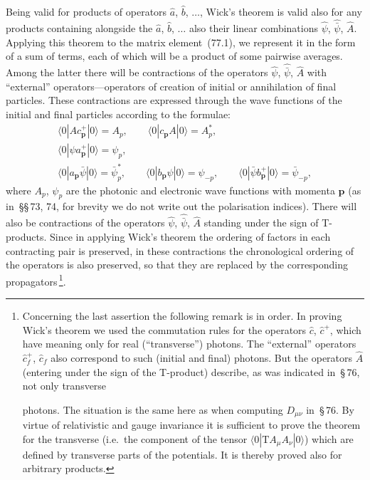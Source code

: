 Being valid for products of operators $\hat{a}$, $\hat{b}$, $\ldots$, Wick's theorem is valid also for any products containing alongside the $\hat{a}$, $\hat{b}$, $\ldots$ also their linear combinations $\hat{\psi}$, $\hat{\bar{\psi}}$, $\hat{A}$. Applying this theorem to the matrix element~(77.1), we represent it in the form of a sum of terms, each of which will be a product of some pairwise averages. Among the latter there will be contractions of the operators $\hat{\psi}$, $\hat{\bar{\psi}}$, $\hat{A}$ with ``external'' operators---operators of creation of initial or annihilation of final particles. These contractions are expressed through the wave functions of the initial and final particles according to the formulae:
\begin{equation}
\begin{gathered}
\langle 0|Ac_\mathbf{p}^+|0\rangle = A_p,\qquad \langle 0|c_\mathbf{p} A|0\rangle = A_p^*,\\[3pt]
\langle 0|\psi a_\mathbf{p}^+|0\rangle = \psi_p,\\[3pt]
\langle 0|a_\mathbf{p}\bar{\psi}|0\rangle = \bar{\psi}_p^*,\qquad \langle 0|b_\mathbf{p}\psi|0\rangle = \psi_{-p},\qquad \langle 0|\bar{\psi}b_\mathbf{p}^+|0\rangle = \bar{\psi}_{-p},
\end{gathered}
\tag{77.3}
\end{equation}
where $A_p$, $\psi_p$ are the photonic and electronic wave functions with momenta $\mathbf{p}$ (as in~\S\S\,73, 74, for brevity we do not write out the polarisation indices). There will also be contractions of the operators $\hat{\psi}$, $\hat{\bar{\psi}}$, $\hat{A}$ standing under the sign of T-products. Since in applying Wick's theorem the ordering of factors in each contracting pair is preserved, in these contractions the chronological ordering of the operators is also preserved, so that they are replaced by the corresponding propagators\,\footnote{Concerning the last assertion the following remark is in order. In proving Wick's theorem we used the commutation rules for the operators $\hat{c}$, $\hat{c}^+$, which have meaning only for real (``transverse'') photons. The ``external'' operators $\hat{c}_f^+$, $\hat{c}_f$ also correspond to such (initial and final) photons. But the operators $\hat{A}$ (entering under the sign of the T-product) describe, as was indicated in~\S\,76, not only transverse

photons. The situation is the same here as when computing $D_{\mu\nu}$ in~\S\,76. By virtue of relativistic and gauge invariance it is sufficient to prove the theorem for the transverse (i.e.\ the component of the tensor $\langle 0|\mathrm{T}A_\mu A_\nu|0\rangle$) which are defined by transverse parts of the potentials. It is thereby proved also for arbitrary products.}.

